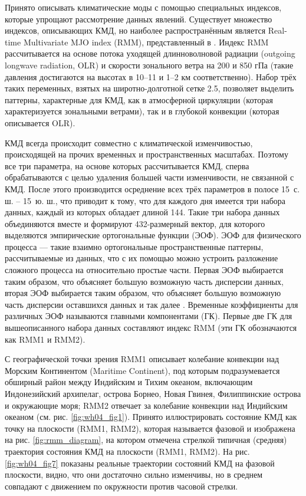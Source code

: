 
Принято описывать климатические моды с помощью специальных индексов, которые упрощают рассмотрение данных явлений. Существует множество индексов, описывающих КМД, но наиболее распространённым является Real-time Multivariate MJO index (RMM), представленный в \cite{Wheeler_Hendon_2004}. Индекс RMM рассчитывается на основе потока уходящей длинноволновой радиации (outgoing longwave radiation, OLR) и скорости зонального ветра на 200 и 850 гПа (такие давления достигаются на высотах в 10--11 и 1--2 км соответственно). Набор трёх таких переменных, взятых на широтно-долготной сетке 2.5\textdegree{}\textdegree, позволяет выделить паттерны, характерные для КМД, как в атмосферной циркуляции (которая характеризуется зональными ветрами), так и в глубокой конвекции (которая описывается OLR).

КМД всегда происходит совместно с климатической изменчивостью, происходящей на прочих временных и пространственных масштабах. Поэтому все три параметра, на основе которых рассчитывается КМД, сперва обрабатываются с целью удаления большей части изменчивости, не связанной с КМД. После этого производится осреднение всех трёх параметров в полосе 15\textdegree\ с. ш. – 15\textdegree\ ю. ш., что приводит к тому, что для каждого дня имеется три набора данных, каждый из которых обладает длиной 144. Такие три набора данных объединяются вместе и формируют 432-размерный вектор, для которого выделяются эмпирические ортогональные функции (ЭОФ). ЭОФ для физического процесса --- такие взаимно ортогональные пространственные паттерны, рассчитываемые из данных, что с их помощью можно устроить разложение сложного процесса на относительно простые части. Первая ЭОФ выбирается таким образом, что объясняет большую возможную часть дисперсии данных, вторая ЭОФ выбирается таким образом, что объясняет большую возможную часть дисперсии оставшихся данных и так далее \cite[Гл. 6]{Zhang_et_al_2020}. Временные коэффициенты для различных ЭОФ называются главными компонентами (ГК). Первые две ГК для вышеописанного набора данных составляют индекс RMM (эти ГК обозначаются как RMM1 и RMM2).

С географической точки зрения RMM1 описывает колебание конвекции над Морским Континентом (Maritime Continent), под которым подразумевается обширный район между Индийским и Тихим океаном, включающим Индонезийский архипелаг, острова Борнео, Новая Гвинея, Филиппинские острова и окружающие моря; RMM2 отвечает за колебание конвекции над Индийским океаном (см. рис. \ref{fig:wh04_fig1}). Принято иллюстрировать состояние КМД как точку на плоскости (RMM1, RMM2), которая называется фазовой и изображена на рис. \ref{fig:rmm_diagram}, на котором отмечена стрелкой типичная (средняя) траектория состояния КМД на плоскости (RMM1, RMM2). На рис. \ref{fig:wh04_fig7} показаны реальные траектории состояний КМД на фазовой плоскости, видно, что они достаточно сильно изменчивы, но в среднем совпадают с движением по окружности против часовой стрелки.

